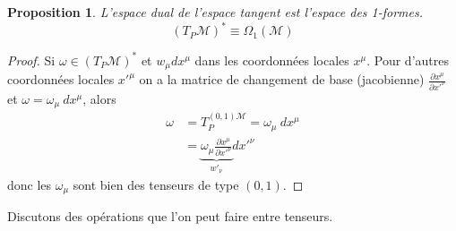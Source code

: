 \documentclass[a4paper,11pt]{report}
\theoremstyle{definition}
\theoremstyle{plain}
\newtheorem{prop}[thm]{Proposition}
\theoremstyle{definition}
\theoremstyle{remark}
\newcommand{\M}{\mathscr{M}}
\newcommand{\p}{\partial}
\begin{document}
                \begin{prop}
                    L'espace dual de l'espace tangent est l'espace des 1-formes.
                    \begin{equation}
                        (T_P\M)^* \equiv \Omega_1(\M)
                    \end{equation}
                \end{prop}
            
                \begin{proof}
                    Si $\omega\in (T_P\M)^*$ et $w_\mu dx^\mu$ dans les coordonnées locales $x^\mu$. Pour d'autres coordonnées locales $x'^\mu$ on a la matrice de changement de base (jacobienne) $ \frac{\p x^\mu}{\p x'^\nu}$ et $\omega = \omega_\mu~dx^\mu$, alors
                    \begin{align}
                        \omega &= T_P^{(0,1)\M} = \omega_\mu~dx^\mu \\
                        &=  \underbrace{\omega_\mu \frac{\p x^\mu}{\p x'^\nu}}_{w'_\nu}dx'^\nu
                    \end{align}
                    donc les $\omega_\mu$ sont bien des tenseurs de type $(0,1)$.
                \end{proof}
                
                Discutons des opérations que l'on peut faire entre tenseurs.
                
\end{document}
